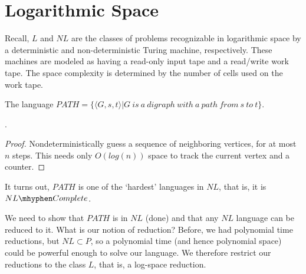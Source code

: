 


\section*{Logarithmic Space}

Recall, $L$ and $NL$ are the classes of problems recognizable in logarithmic space by a deterministic and non-deterministic Turing machine, respectively.  These machines are modeled as having a read-only input tape and a read/write work tape.  The space complexity is determined by the number of cells used on the work tape.

The language $PATH = \{\langle G,s,t\rangle | G \ is \ a \ digraph \ with \ a \ path \ from \ s \ to \ t\}$.
	
.

\begin{proof}
	Nondeterministically guess a sequence of neighboring vertices, for at most $n$ steps. This needs only $O(log(n))$ space to track the current vertex and a counter.
\end{proof}


It turns out, $PATH$ is one of the `hardest' languages in $NL$, that is, it is $NL\mhyphen Complete$.





	 We need to show that $PATH$ is in $NL$ (done) and that any $NL$ language can be reduced to it.  What is our notion of reduction?  Before, we had polynomial time reductions, but $NL\subset P$, so a polynomial time (and hence polynomial space) could be powerful enough to solve our language.  We therefore restrict our reductions to the class $L$, that is, a log-space reduction.
	 
	 
	 
	 
